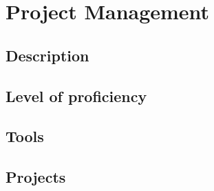\section{Project Management}

\subsection{Description}
\subsection{Level of proficiency}
\subsection{Tools}
\subsection{Projects}

\newpage
